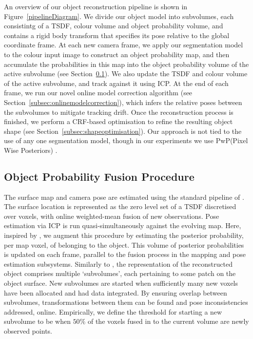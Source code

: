 An overview of our object reconstruction pipeline is shown in Figure~\ref{pipelineDiagram}. We divide our object model into subvolumes, each consistintg of a TSDF, 
colour volume and object probability volume, and contains a rigid body transform that specifies its pose relative to the global coordinate frame. At each new camera frame, we apply our segmentation model to the colour input image to construct an object probability map, and then accumulate the probabilities in this map into the object probability volume of the active subvolume (see Section~\ref{subsec:probfusion}). We also update the TSDF and colour volume of the active subvolume, and track against it using ICP. At the end of each frame, we run our novel online model correction algorithm (see Section~\ref{subsec:onlinemodelcorrection}), which infers the relative poses between the subvolumes to mitigate tracking drift. Once the reconstruction process is finished, we perform a CRF-based optimisation to refine the resulting object shape (see Section~\ref{subsec:shapeoptimisation}). Our approach is not tied to the use of any one segmentation model, though in our experiments we use PwP(Pixel Wise Posteriors) \cite{Bibby2008}.

\subsection{Object Probability Fusion Procedure}
\label{subsec:probfusion}

The surface map and camera pose are estimated using the standard pipeline of \cite{Newcombe2011,Prisacariu2014}. The surface location is represented as the zero level set of a TSDF discretised over voxels, with online weighted-mean fusion of new observations. Pose estimation via ICP is run quasi-simultaneously against the evolving map. Here, inspired by \cite{Kolev2006}, we augment this procedure by estimating the posterior probability, per map voxel, of belonging to the object. This volume of posterior probabilities is updated on each frame, parallel to the fusion process in the mapping and pose estimation subsystems. Similarly to \cite{Kahler2016}, the representation of the reconstructed object comprises multiple `subvolumes', each pertaining to some patch on the object surface. New subvolumes are started when sufficiently many new voxels have been allocated and had data integrated. By ensuring overlap between subvolumes, transformations between them can be found and pose inconsistencies addressed, online. Empirically, we define the threshold for starting a new subvolume to be when $50\%$ of the voxels fused in to the current volume are newly observed points.

